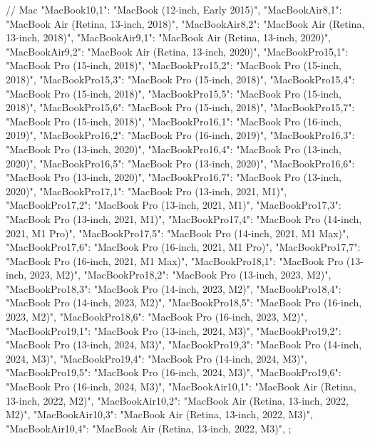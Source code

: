 {   // Mac
   "MacBook10,1": "MacBook (12-inch, Early 2015)",
   "MacBookAir8,1": "MacBook Air (Retina, 13-inch, 2018)",
   "MacBookAir8,2": "MacBook Air (Retina, 13-inch, 2018)",
   "MacBookAir9,1": "MacBook Air (Retina, 13-inch, 2020)",
   "MacBookAir9,2": "MacBook Air (Retina, 13-inch, 2020)",
   "MacBookPro15,1": "MacBook Pro (15-inch, 2018)",
   "MacBookPro15,2": "MacBook Pro (15-inch, 2018)",
   "MacBookPro15,3": "MacBook Pro (15-inch, 2018)",
   "MacBookPro15,4": "MacBook Pro (15-inch, 2018)",
   "MacBookPro15,5": "MacBook Pro (15-inch, 2018)",
   "MacBookPro15,6": "MacBook Pro (15-inch, 2018)",
   "MacBookPro15,7": "MacBook Pro (15-inch, 2018)",
   "MacBookPro16,1": "MacBook Pro (16-inch, 2019)",
   "MacBookPro16,2": "MacBook Pro (16-inch, 2019)",
   "MacBookPro16,3": "MacBook Pro (13-inch, 2020)",
   "MacBookPro16,4": "MacBook Pro (13-inch, 2020)",
   "MacBookPro16,5": "MacBook Pro (13-inch, 2020)",
   "MacBookPro16,6": "MacBook Pro (13-inch, 2020)",
   "MacBookPro16,7": "MacBook Pro (13-inch, 2020)",
   "MacBookPro17,1": "MacBook Pro (13-inch, 2021, M1)",
   "MacBookPro17,2": "MacBook Pro (13-inch, 2021, M1)",
   "MacBookPro17,3": "MacBook Pro (13-inch, 2021, M1)",
   "MacBookPro17,4": "MacBook Pro (14-inch, 2021, M1 Pro)",
   "MacBookPro17,5": "MacBook Pro (14-inch, 2021, M1 Max)",
   "MacBookPro17,6": "MacBook Pro (16-inch, 2021, M1 Pro)",
   "MacBookPro17,7": "MacBook Pro (16-inch, 2021, M1 Max)",
   "MacBookPro18,1": "MacBook Pro (13-inch, 2023, M2)",
   "MacBookPro18,2": "MacBook Pro (13-inch, 2023, M2)",
   "MacBookPro18,3": "MacBook Pro (14-inch, 2023, M2)",
   "MacBookPro18,4": "MacBook Pro (14-inch, 2023, M2)",
   "MacBookPro18,5": "MacBook Pro (16-inch, 2023, M2)",
   "MacBookPro18,6": "MacBook Pro (16-inch, 2023, M2)",
   "MacBookPro19,1": "MacBook Pro (13-inch, 2024, M3)",
   "MacBookPro19,2": "MacBook Pro (13-inch, 2024, M3)",
   "MacBookPro19,3": "MacBook Pro (14-inch, 2024, M3)",
   "MacBookPro19,4": "MacBook Pro (14-inch, 2024, M3)",
   "MacBookPro19,5": "MacBook Pro (16-inch, 2024, M3)",
   "MacBookPro19,6": "MacBook Pro (16-inch, 2024, M3)",
   "MacBookAir10,1": "MacBook Air (Retina, 13-inch, 2022, M2)",
   "MacBookAir10,2": "MacBook Air (Retina, 13-inch, 2022, M2)",
   "MacBookAir10,3": "MacBook Air (Retina, 13-inch, 2022, M3)",
   "MacBookAir10,4": "MacBook Air (Retina, 13-inch, 2022, M3)",
};

